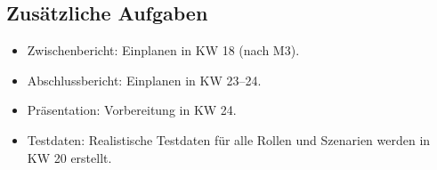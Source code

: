 \documentclass[12pt,a4paper]{article}
\begin{document}
\subsection{Zusätzliche Aufgaben}
\begin{itemize}
  \item Zwischenbericht: Einplanen in KW 18 (nach M3).
  \item Abschlussbericht: Einplanen in KW 23--24.
  \item Präsentation: Vorbereitung in KW 24.
  \item Testdaten: Realistische Testdaten für alle Rollen und Szenarien werden in KW 20 erstellt.
\end{itemize}
\end{document}
